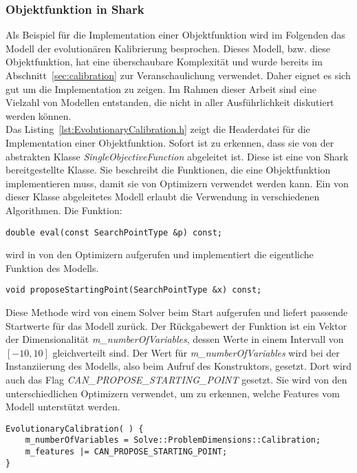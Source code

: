 \subsubsection{Objektfunktion in Shark}
\label{sec:Shark_model}
%
Als Beispiel für die Implementation einer Objektfunktion wird im Folgenden das Modell der evolutionären Kalibrierung besprochen. Dieses Modell, bzw. diese Objektfunktion, hat eine überschaubare Komplexität und wurde bereits im Abschnitt~\ref{sec:calibration} zur Veranschaulichung verwendet. Daher eignet es sich gut um die Implementation zu zeigen. Im Rahmen dieser Arbeit sind eine Vielzahl von Modellen entstanden, die nicht in aller Ausführlichkeit diskutiert werden können.\\
%
Das Listing~\ref{lst:EvolutionaryCalibration.h} zeigt die Headerdatei für die Implementation einer Objektfunktion. Sofort ist zu erkennen, dass sie von der abstrakten Klasse \textit{SingleObjectiveFunction} abgeleitet ist. Diese ist eine von Shark bereitgestellte Klasse. Sie beschreibt die Funktionen, die eine Objektfunktion implementieren muss, damit sie von Optimizern verwendet werden kann. Ein von dieser Klasse abgeleitetes Modell erlaubt die Verwendung in verschiedenen Algorithmen. Die Funktion:
%
\begin{lstlisting}
double eval(const SearchPointType &p) const;
\end{lstlisting}
%
wird in von den Optimizern aufgerufen und implementiert die eigentliche Funktion des Modells.
%
\begin{lstlisting}[label=EvolutionaryCalibration_2]
void proposeStartingPoint(SearchPointType &x) const;
\end{lstlisting}
%
Diese Methode wird von einem Solver beim Start aufgerufen und liefert passende Startwerte für das Modell zurück.
Der Rückgabewert der Funktion ist ein Vektor der Dimensionalität  \textit{m\_numberOfVariables}, dessen Werte in einem Intervall von $[-10,10]$ gleichverteilt sind.
Der Wert für \textit{m\_numberOfVariables} wird bei der Instanziierung des Modells, also beim Aufruf des Konstruktors, gesetzt.
Dort wird auch das Flag \textit{CAN\_PROPOSE\_STARTING\_POINT} gesetzt.%
Sie wird von den unterschiedlichen Optimizern verwendet, um zu erkennen, welche Features vom Modell unterstützt werden.
\begin{lstlisting}[label=EvolutionaryCalibration_3]
	EvolutionaryCalibration( ) {
	m_numberOfVariables = Solve::ProblemDimensions::Calibration;
	m_features |= CAN_PROPOSE_STARTING_POINT;
}
\end{lstlisting}	
